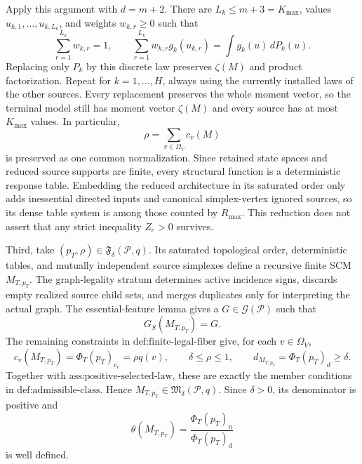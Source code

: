 Apply this argument with \(d=m+2\).  There are \(L_k\leq m+3=K_{\max}\), values \(u_{k,1},\ldots,u_{k,L_k}\), and weights \(w_{k,r}\geq0\) such that
\[
\sum_{r=1}^{L_k}w_{k,r}=1,
\qquad
\sum_{r=1}^{L_k}w_{k,r}g_k(u_{k,r})
=\int g_k(u)\,dP_k(u).
\]
Replacing only \(P_k\) by this discrete law preserves \(\zeta(M)\) and product factorization.  Repeat for \(k=1,\ldots,H\), always using the currently installed laws of the other sources.  Every replacement preserves the whole moment vector, so the terminal model still has moment vector \(\zeta(M)\) and every source has at most \(K_{\max}\) values.  In particular,
\[
\rho=\sum_{v\in\Omega_V}c_v(M)
\]
is preserved as one common normalization.  Since retained state spaces and reduced source supports are finite, every structural function is a deterministic response table.  Embedding the reduced architecture in its saturated order only adds inessential directed inputs and canonical simplex-vertex ignored sources, so its dense table system is among those counted by \(R_{\max}\).  This reduction does not assert that any strict inequality \(Z_e>0\) survives.

Third, take \((p_T,\rho)\in\mathfrak F_\delta(\mathcal P,q)\).  Its saturated topological order, deterministic tables, and mutually independent source simplexes define a recursive finite SCM \(M_{T,p_T}\).  The graph-legality stratum determines active incidence signs, discards empty realized source child sets, and merges duplicates only for interpreting the actual graph.  The essential-feature lemma gives a \(G\in\mathcal G(\mathcal P)\) such that
\[
G_S(M_{T,p_T})=G.
\]
The remaining constraints in \(\text{def:finite-legal-fiber}\) give, for each \(v\in\Omega_V\),
\[
c_v(M_{T,p_T})=\Phi_T(p_T)_{c_v}=\rho q(v),
\qquad
\delta\leq\rho\leq1,
\qquad
d_{M_{T,p_T}}=\Phi_T(p_T)_d\geq\delta.
\]
Together with \(\text{ass:positive-selected-law}\), these are exactly the member conditions in \(\text{def:admissible-class}\).  Hence \(M_{T,p_T}\in\mathfrak M_\delta(\mathcal P,q)\).  Since \(\delta>0\), its denominator is positive and
\[
\theta(M_{T,p_T})=
\frac{\Phi_T(p_T)_n}{\Phi_T(p_T)_d}
\]
is well defined.

